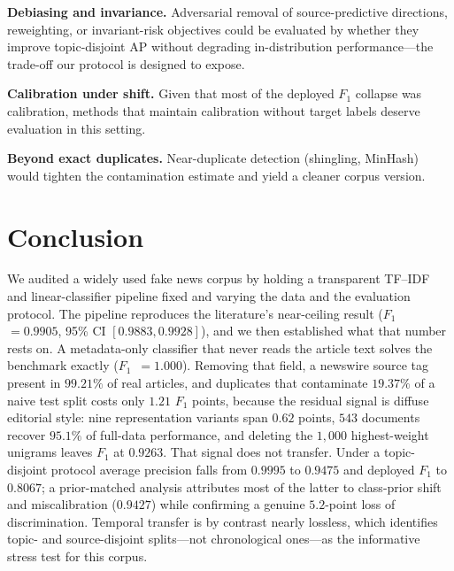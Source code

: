 \documentclass[conference]{IEEEtran}
\newcommand{\Fone}{$F_1$}
\begin{document}
\textbf{Debiasing and invariance.} Adversarial removal of source-predictive
directions, reweighting, or invariant-risk objectives could be evaluated by
whether they improve topic-disjoint AP without degrading in-distribution
performance---the trade-off our protocol is designed to expose.

\textbf{Calibration under shift.} Given that most of the deployed \Fone{}
collapse was calibration, methods that maintain calibration without target
labels \cite{guo2017calibration} deserve evaluation in this setting.

\textbf{Beyond exact duplicates.} Near-duplicate detection (shingling, MinHash)
would tighten the contamination estimate and yield a cleaner corpus version.

\section{Conclusion}
\label{sec:conclusion}

We audited a widely used fake news corpus by holding a transparent TF--IDF and
linear-classifier pipeline fixed and varying the data and the evaluation
protocol. The pipeline reproduces the literature's near-ceiling result
(\Fone{}~$=0.9905$, 95\% CI $[0.9883,0.9928]$), and we then established what
that number rests on. A metadata-only classifier that never reads the article
text solves the benchmark exactly (\Fone{}~$=1.000$). Removing that field, a
newswire source tag present in $99.21\%$ of real articles, and duplicates that
contaminate $19.37\%$ of a naive test split costs only $1.21$ \Fone{} points,
because the residual signal is diffuse editorial style: nine representation
variants span $0.62$ points, $543$ documents recover $95.1\%$ of full-data
performance, and deleting the $1{,}000$ highest-weight unigrams leaves \Fone{}
at $0.9263$. That signal does not transfer. Under a topic-disjoint protocol
average precision falls from $0.9995$ to $0.9475$ and deployed \Fone{} to
$0.8067$; a prior-matched analysis attributes most of the latter to class-prior
shift and miscalibration ($0.9427$) while confirming a genuine $5.2$-point loss
of discrimination. Temporal transfer is by contrast nearly lossless, which
identifies topic- and source-disjoint splits---not chronological ones---as the
informative stress test for this corpus.
\end{document}
